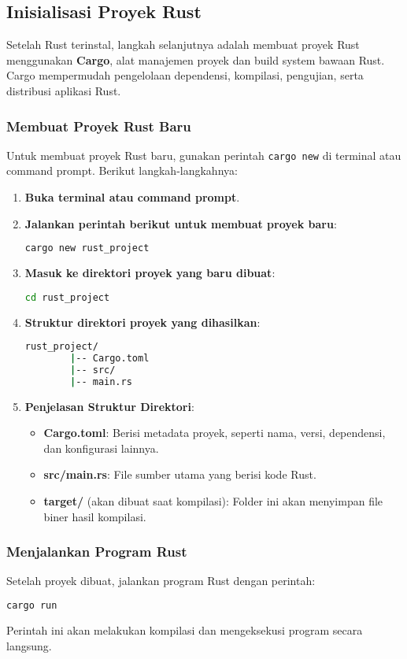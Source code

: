\subsection{Inisialisasi Proyek Rust}

Setelah Rust terinstal, langkah selanjutnya adalah membuat proyek Rust menggunakan \textbf{Cargo}, alat manajemen proyek dan build system bawaan Rust. Cargo mempermudah pengelolaan dependensi, kompilasi, pengujian, serta distribusi aplikasi Rust.

\subsubsection{Membuat Proyek Rust Baru}
Untuk membuat proyek Rust baru, gunakan perintah \texttt{cargo new} di terminal atau command prompt. Berikut langkah-langkahnya:

\begin{enumerate}
	\item \textbf{Buka terminal atau command prompt}.
	\item \textbf{Jalankan perintah berikut untuk membuat proyek baru}:
	\begin{lstlisting}[language=bash]
		cargo new rust_project
	\end{lstlisting}
	\item \textbf{Masuk ke direktori proyek yang baru dibuat}:
	\begin{lstlisting}[language=bash]
		cd rust_project
	\end{lstlisting}
	\item \textbf{Struktur direktori proyek yang dihasilkan}:
	\begin{lstlisting}[language=bash]
		rust_project/
		|-- Cargo.toml
		|-- src/
		|-- main.rs
	\end{lstlisting}
	\item \textbf{Penjelasan Struktur Direktori}:
	\begin{itemize}
		\item \textbf{Cargo.toml}: Berisi metadata proyek, seperti nama, versi, dependensi, dan konfigurasi lainnya.
		\item \textbf{src/main.rs}: File sumber utama yang berisi kode Rust.
		\item \textbf{target/} (akan dibuat saat kompilasi): Folder ini akan menyimpan file biner hasil kompilasi.
	\end{itemize}
\end{enumerate}

\subsubsection{Menjalankan Program Rust}
Setelah proyek dibuat, jalankan program Rust dengan perintah:
\begin{lstlisting}[language=bash]
	cargo run
\end{lstlisting}
Perintah ini akan melakukan kompilasi dan mengeksekusi program secara langsung.

